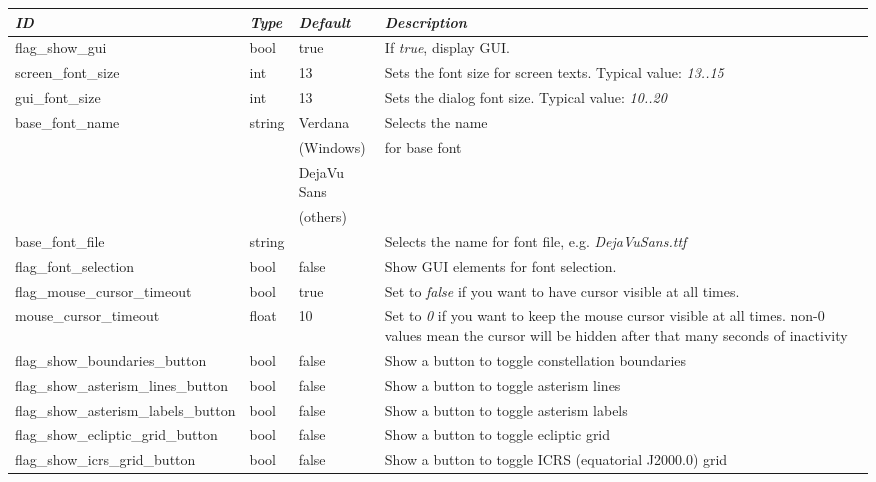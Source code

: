 \begin{longtable}{p{50mm}|l|l|p{55mm}}
\toprule
\emph{ID} & \emph{Type} & \emph{Default} & \emph{Description}\\\midrule
flag\_show\_gui                 & bool   & true & If \emph{true}, display GUI.\\\midrule
screen\_font\_size & int  & 13 & Sets the font size for screen texts. Typical value: \emph{13..15}\\%
gui\_font\_size  & int    & 13 & Sets the dialog font size. Typical value: \emph{10..20}\\%
base\_font\_name & string & Verdana     & Selects the name \\
                 &        & (Windows)            & for base font\\
                 &        & DejaVu Sans & \\
                 &        & (others)            & \\%
base\_font\_file                & string &      & Selects the name for font file, e.g. \emph{DejaVuSans.ttf}\\
flag\_font\_selection           & bool  & false & Show GUI elements for font selection.\\\midrule
flag\_mouse\_cursor\_timeout    & bool  & true  & Set to \emph{false} if you want to have cursor visible at all times.\\%
mouse\_cursor\_timeout          & float & 10    & Set to \emph{0} if you want to keep the mouse cursor visible at all times. 
                                                  non-0 values mean the cursor will be hidden after that many seconds of inactivity\\\midrule
%
flag\_show\_boundaries\_button         & bool  & false & Show a button to toggle constellation boundaries\\
flag\_show\_asterism\_lines\_button    & bool  & false & Show a button to toggle asterism lines\\
flag\_show\_asterism\_labels\_button   & bool  & false & Show a button to toggle asterism labels\\
flag\_show\_ecliptic\_grid\_button     & bool  & false & Show a button to toggle ecliptic grid\\
flag\_show\_icrs\_grid\_button         & bool  & false & Show a button to toggle ICRS (equatorial J2000.0) grid\\

\end{longtable}
